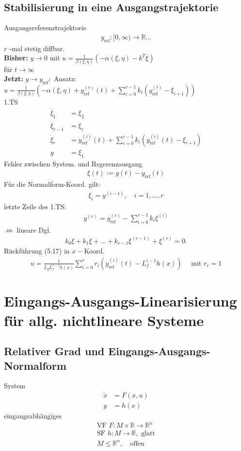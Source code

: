 \documentclass[ngerman]{tudscrreprt}
\begin{document}
\subsection{Stabilisierung in eine Ausgangstrajektorie}
Ausgangsreferenztrajektorie \begin{align*}
y_{\text{ref}} :[0, \infty ) \to \mathbb{R} \dots
\end{align*} $r$ -mal stetig diffbar.\\
\textbf{Bisher: } $y \to 0 $ mit $u  = \frac{1}{\beta (\xi, \eta)} (-\alpha(\xi,\eta) - k^T \xi)$\\ 
für $t \to \infty$\\ 
\textbf{Jetzt: } $y \to y_{\text{ref}} :$ Ansatz: $u =\frac{1}{\beta(\xi,\eta)} (-\alpha(\xi,\eta) + y_{\text{ref}}^{(r)}(t) + \sum\limits_{i=0}^{r-1} k_i (y_{\text{ref} }^{(i)} - \xi_{i+1}))$\\ 
1.TS \begin{align*}
\dot \xi_1 &= \xi_2\\ 
\dot \xi_{r-1}&= \xi_r\\ 
\dot \xi_r &=y_{\text{ref}}^{(i)}(t) + \sum\limits_{i=0}^{r-1}k_i(y_{\text{ref}}^{(i)}(t) - \xi_{i+1})\\ 
y &= \xi_1\tag{5.17}
\end{align*}
Fehler zwischen System. und Regerenzausgang \begin{align*} \xi(t) := y(t) - y_{\text{ref}}(t) \end{align*} Für die Normalform-Koord. gilt: \begin{align*}
\xi_{i} = y^{(i-1)}, \quad i= 1,\dots,r
\end{align*}
letzte Zeile des 1.TS: \begin{align*}
y^{(r)} = y_{\text{ref}}^{(r)} - \sum\limits_{i=0}^{r-1} k_i \xi^{(i)}
\end{align*}
$\iff$ lineare Dgl. \begin{align*}
k_0 \xi + k_1 \dot \xi + \dots + k_{r-1}\xi^{(r-1)} + \xi^{(r)} = 0.
\end{align*}
Rückführung (5.17) in $x-$Koord. \begin{align*}
u = \frac{1}{L_g L_f^{r-1} h(x)} \sum\limits_{i=0}^{r} r_i(y_{\text{ref}}^{(i)} (t) - L_f^{i-1} h(x)) \quad \text{ mit } r_r =1
\end{align*}
\section{ Eingangs-Ausgangs-Linearisierung für allg. nichtlineare Systeme}
\subsection{ Relativer Grad und Eingangs-Ausgangs-Normalform}
System \begin{align*}
\dot x &= F(x,u) \\ 
y &= h(x) \tag{5.20}
\end{align*} 
eingangsabhängiges \begin{align*}
\text{VF } F: M\times \mathbb{R}\to \mathbb{R}^{n} \\ 
\text{SF } h: M\to \mathbb{R}, \text{ glatt}\\ 
M\le \mathbb{R}^n, \quad \text{offen }
\end{align*}
\end{document}
